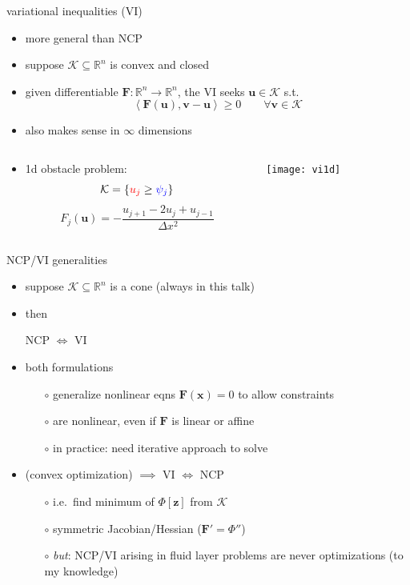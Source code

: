 \documentclass[xcolor={dvipsnames}]{beamer}
\newcommand\bu{\mathbf{u}}
\newcommand\bv{\mathbf{v}}
\newcommand\bx{\mathbf{x}}
\newcommand\bz{\mathbf{z}}
\newcommand\bF{\mathbf{F}}
\newcommand\RR{\mathbb{R}}
\newcommand{\ip}[2]{\ensuremath{\left<#1,#2\right>}}
\begin{document}
\begin{frame}{variational inequalities (VI)}

\begin{itemize}
\item more general than NCP
\item suppose $\mathcal{K}\subseteq \RR^n$ is convex and closed
\item given differentiable $\bF:\RR^n \to \RR^n$, the VI seeks $\bu\in\mathcal{K}$ s.t.
\begin{equation*}
     \ip{\bF(\bu)}{\bv-\bu} \ge 0 \qquad \forall \bv \in \mathcal{K}
\end{equation*}
\item also makes sense in $\infty$ dimensions
\end{itemize}

\begin{columns}
\begin{column}{0.4\textwidth}
\small
\begin{itemize}
\item \alert{1d obstacle problem}:
  $$\mathcal{K} = \{{\color{red} u_j} \ge {\color{blue} \psi_j}\}$$
  $$F_j(\bu) = - \frac{u_{j+1} - 2 u_j + u_{j-1}}{\Delta x^2}$$
\end{itemize}
\end{column}
\begin{column}{0.6\textwidth}
\texttt{[image: vi1d]}
\end{column}
\end{columns}
\end{frame}


\begin{frame}{NCP/VI generalities}

\begin{itemize}
\item suppose $\mathcal{K}\subseteq \RR^n$ is a cone (always in this talk)
\item then
\begin{center}
\alert{NCP $\iff$ VI}
\end{center}
\item both formulations
  \begin{itemize}
  \item[$\circ$]  generalize nonlinear eqns $\bF(\bx)=0$ to allow constraints
  \item[$\circ$]  are nonlinear, even if $\bF$ is linear or affine
  \item[$\circ$]  in practice: need iterative approach to solve
  \end{itemize}
\item (convex optimization) $\implies$ VI $\iff$ NCP
  \begin{itemize}
  \item[$\circ$]  i.e.~find minimum of $\Phi[\bz]$ from $\mathcal{K}$
  \item[$\circ$]  symmetric Jacobian/Hessian ($\bF' = \Phi''$)
  \item[$\circ$]  \emph{but}: NCP/VI arising in fluid layer problems are never optimizations (to my knowledge)
  \end{itemize}
\end{itemize}
\end{frame}
\end{document}
